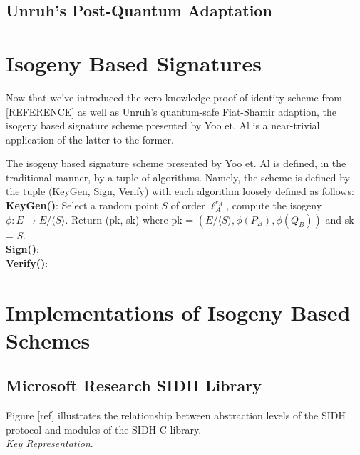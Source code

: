 \subsection{Unruh's Post-Quantum Adaptation}


\section{Isogeny Based Signatures}

Now that we've introduced the zero-knowledge proof of identity scheme from [REFERENCE] as well as Unruh's quantum-safe Fiat-Shamir adaption, the isogeny based signature scheme presented by Yoo et. Al is a near-trivial application of the latter to the former. 

The isogeny based signature scheme presented by Yoo et. Al is defined, in the traditional manner, by a tuple of algorithms. Namely, the scheme is defined by the tuple (KeyGen, Sign, Verify) with each algorithm loosely defined as follows:\\
\textbf{KeyGen(}\textbf{)}: Select a random point $S$ of order $\ell_{A}^{e_A}$, compute the isogeny $\phi: E \rightarrow E/ \langle S \rangle$. Return (pk, sk) where pk = $(E/ \langle S \rangle, \phi(P_B), \phi(Q_B))$ and sk = $S$.\\
\textbf{Sign()}:\\
\textbf{Verify()}:\\


\section{Implementations of Isogeny Based Schemes}

\subsection{Microsoft Research SIDH Library}

Figure [ref] illustrates the relationship between abstraction levels of the SIDH protocol and modules of the SIDH C library.\\

\noindent
\emph{Key Representation}.

